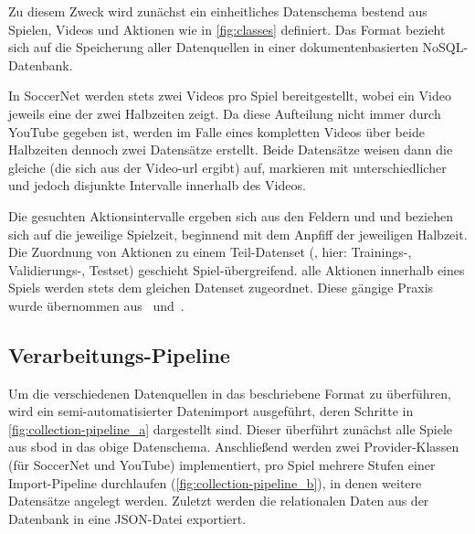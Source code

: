 Zu diesem Zweck wird zunächst ein einheitliches Datenschema bestend aus Spielen, Videos und Aktionen wie in \autoref{fig:classes} definiert.
Das Format bezieht sich auf die Speicherung aller Datenquellen in einer dokumentenbasierten NoSQL-Datenbank.

In SoccerNet werden stets zwei Videos pro Spiel bereitgestellt, wobei ein Video jeweils eine der zwei Halbzeiten zeigt.
Da diese Aufteilung nicht immer durch YouTube gegeben ist, werden im Falle eines kompletten Videos über beide Halbzeiten dennoch zwei Datensätze erstellt.
Beide Datensätze weisen dann die gleiche  (die sich aus der Video-\gls{url} ergibt) auf, markieren mit unterschiedlicher  und  jedoch disjunkte Intervalle innerhalb des Videos.

Die gesuchten Aktionsintervalle ergeben sich aus den Feldern  und  und beziehen sich auf die jeweilige Spielzeit, beginnend mit dem Anpfiff der jeweiligen Halbzeit.
Die Zuordnung von Aktionen zu einem Teil-Datenset (, hier: Trainings-, Validierungs-, Testset) geschieht Spiel-übergreifend.
\Dh alle Aktionen innerhalb eines Spiels werden stets dem gleichen Datenset zugeordnet.
Diese gängige Praxis wurde übernommen aus~\cite{Giancola18} und~\cite{Jiang19}.

\subsection{Verarbeitungs-Pipeline}
\label{subsec:pipeline}

Um die verschiedenen Datenquellen in das beschriebene Format zu überführen, wird ein semi-automatisierter Datenimport ausgeführt, deren Schritte in \autoref{fig:collection-pipeline_a} dargestellt sind.
Dieser überführt zunächst alle Spiele aus \gls{sbod} in das obige Datenschema.
Anschließend werden zwei Provider-Klassen (für SoccerNet und YouTube) implementiert, pro Spiel mehrere Stufen einer Import-Pipeline durchlaufen (\autoref{fig:collection-pipeline_b}), in denen weitere Datensätze angelegt werden.
Zuletzt werden die relationalen Daten aus der Datenbank in eine JSON-Datei exportiert.

